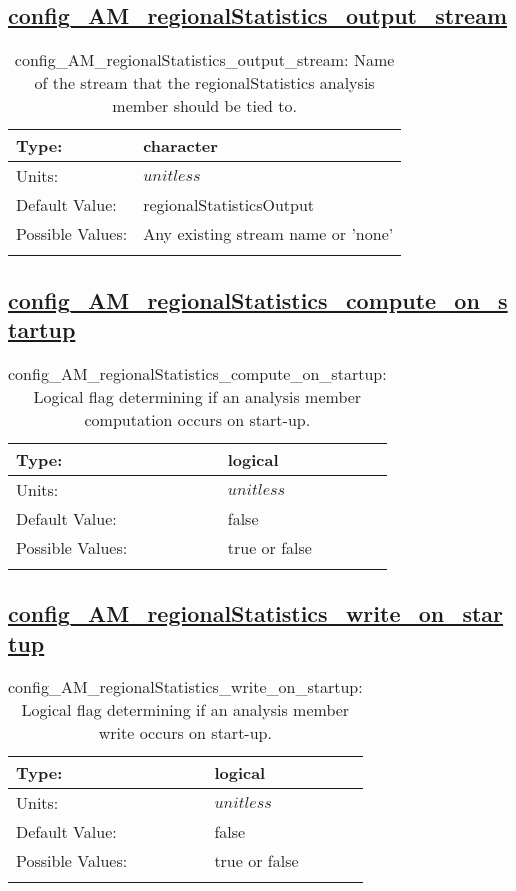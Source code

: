 \subsection[config\_AM\_regionalStatistics\_output\_stream]{\hyperref[sec:nm_tab_AM_regionalStatistics]{config\_AM\_regionalStatistics\_output\_stream}}
\label{subsec:nm_sec_config_AM_regionalStatistics_output_stream}
\begin{center}
\begin{longtable}{| p{2.0in} || p{4.0in} |}
    \hline
    Type: & character \\
    \hline
    Units: & $unitless$ \\
    \hline
    Default Value: & regionalStatisticsOutput \\
    \hline
    Possible Values: & Any existing stream name or 'none' \\
    \hline
    \caption{config\_AM\_regionalStatistics\_output\_stream: Name of the stream that the regionalStatistics analysis member should be tied to.}
\end{longtable}
\end{center}
\subsection[config\_AM\_regionalStatistics\_compute\_on\_startup]{\hyperref[sec:nm_tab_AM_regionalStatistics]{config\_AM\_regionalStatistics\_compute\_on\_startup}}
\label{subsec:nm_sec_config_AM_regionalStatistics_compute_on_startup}
\begin{center}
\begin{longtable}{| p{2.0in} || p{4.0in} |}
    \hline
    Type: & logical \\
    \hline
    Units: & $unitless$ \\
    \hline
    Default Value: & false \\
    \hline
    Possible Values: & true or false \\
    \hline
    \caption{config\_AM\_regionalStatistics\_compute\_on\_startup: Logical flag determining if an analysis member computation occurs on start-up.}
\end{longtable}
\end{center}
\subsection[config\_AM\_regionalStatistics\_write\_on\_startup]{\hyperref[sec:nm_tab_AM_regionalStatistics]{config\_AM\_regionalStatistics\_write\_on\_startup}}
\label{subsec:nm_sec_config_AM_regionalStatistics_write_on_startup}
\begin{center}
\begin{longtable}{| p{2.0in} || p{4.0in} |}
    \hline
    Type: & logical \\
    \hline
    Units: & $unitless$ \\
    \hline
    Default Value: & false \\
    \hline
    Possible Values: & true or false \\
    \hline
    \caption{config\_AM\_regionalStatistics\_write\_on\_startup: Logical flag determining if an analysis member write occurs on start-up.}
\end{longtable}
\end{center}
